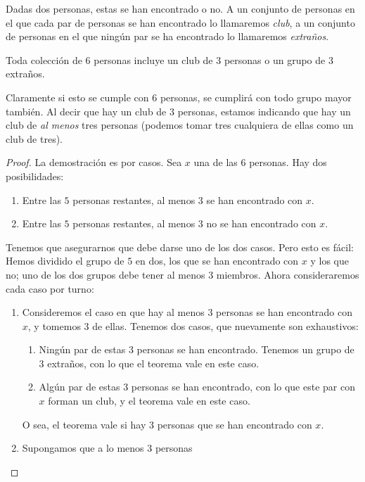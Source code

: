   Dadas dos personas,
  estas se han encontrado o no.
  A un conjunto de personas en el que cada par de personas
  se han encontrado lo llamaremos \emph{club},
  a un conjunto de personas en el que ningún par se ha encontrado
  lo llamaremos \emph{extraños}.
  \begin{theorem}
    Toda colección de \(6\) personas
    incluye un club de \(3\) personas
    o un grupo de \(3\) extraños.
  \end{theorem}
  Claramente si esto se cumple con \(6\) personas,
  se cumplirá con todo grupo mayor también.
  Al decir que hay un club de \(3\) personas,
  estamos indicando
  que hay un club de \emph{al menos} tres personas
  (podemos tomar tres cualquiera de ellas como un club de tres).
  \begin{proof}
    La demostración es por casos.
    Sea \(x\) una de las \(6\) personas.
    Hay dos posibilidades:
    \begin{enumerate}
    \item
      Entre las \(5\) personas restantes,
      al menos \(3\) se han encontrado con \(x\).
    \item
      Entre las \(5\) personas restantes,
      al menos \(3\) no se han encontrado con \(x\).
    \end{enumerate}
    Tenemos que asegurarnos que debe darse uno de los dos casos.
    Pero esto es fácil:
    Hemos dividido el grupo de \(5\) en dos,
    los que se han encontrado con \(x\) y los que no;
    uno de los dos grupos debe tener al menos \(3\) miembros.
    Ahora consideraremos cada caso por turno:
    \begin{enumerate}
    \item
      Consideremos el caso en que hay al menos \(3\) personas
      se han encontrado con \(x\),
      y tomemos \(3\) de ellas.
      Tenemos dos casos,
      que nuevamente son exhaustivos:
      \begin{enumerate}
      \item
	Ningún par de estas \(3\) personas se han encontrado.
	Tenemos un grupo de \(3\) extraños,
	con lo que el teorema vale en este caso.
      \item
	Algún par de estas \(3\) personas se han encontrado,
	con lo que este par con \(x\) forman un club,
	y el teorema vale en este caso.
      \end{enumerate}
      O sea,
      el teorema vale
      si hay \(3\) personas que se han encontrado con \(x\).
    \item
      Supongamos que a lo menos \(3\) personas

\end{enumerate}
\end{proof}
